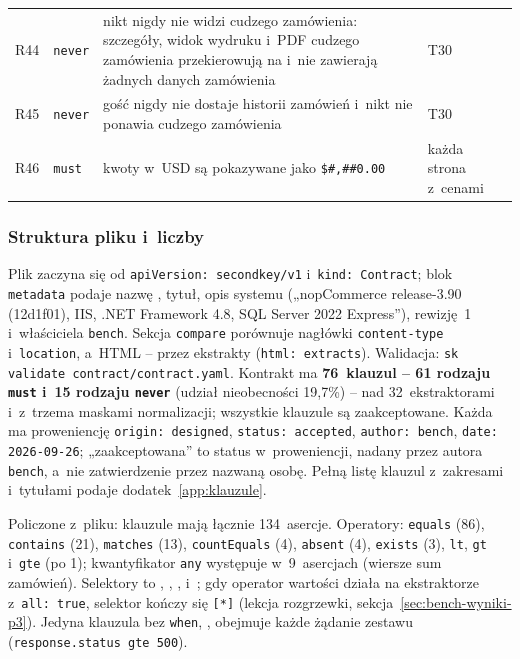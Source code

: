 {\begin{xltabular}{\linewidth}{@{}l l >{\raggedright\arraybackslash}X >{\raggedright\arraybackslash}p{2.2cm}@{}}
R44 & \texttt{never} & nikt nigdy nie widzi cudzego zamówienia: szczegóły, widok wydruku i~PDF cudzego zamówienia przekierowują na  i~nie zawierają żadnych danych zamówienia & T30 \\
R45 & \texttt{never} & gość nigdy nie dostaje historii zamówień i~nikt nie ponawia cudzego zamówienia & T30 \\
R46 & \texttt{must} & kwoty w~USD są pokazywane jako \texttt{\$\#,\#\#0.00} & każda strona z~cenami \\
\end{xltabular}
}


\subsubsection{Struktura pliku i~liczby}\label{sec:bench-kontrakt-struktura}

Plik zaczyna się od \texttt{apiVersion: secondkey/v1} i~\texttt{kind: Contract}; blok
\texttt{metadata} podaje nazwę , tytuł, opis systemu („nopCommerce
release-3.90 (12d1f01), IIS, .NET Framework 4.8, SQL Server 2022 Express”), rewizję~1
i~właściciela \texttt{bench}. Sekcja \texttt{compare} porównuje
nagłówki \texttt{content-type} i~\texttt{location}, a~HTML -- przez ekstrakty
(\texttt{html: extracts}). Walidacja: \texttt{sk validate contract/contract.yaml}.
Kontrakt ma \textbf{76~klauzul -- 61 rodzaju \texttt{must} i~15 rodzaju \texttt{never}}
(udział nieobecności 19,7\%) -- nad 32~ekstraktorami i~z~trzema maskami normalizacji;
wszystkie klauzule są zaakceptowane. Każda ma proweniencję \texttt{origin: designed},
\texttt{status: accepted}, \texttt{author: bench}, \texttt{date: 2026-09-26}; „zaakceptowana”
to status w~proweniencji, nadany przez autora \texttt{bench}, a~nie zatwierdzenie przez nazwaną
osobę. Pełną listę klauzul z~zakresami i~tytułami podaje dodatek~\ref{app:klauzule}.

Policzone z~pliku: klauzule mają łącznie 134~asercje. Operatory: \texttt{equals} (86),
\texttt{contains} (21), \texttt{matches} (13), \texttt{countEquals} (4),
\texttt{absent} (4), \texttt{exists} (3), \texttt{lt}, \texttt{gt} i~\texttt{gte} (po
1); kwantyfikator \texttt{any} występuje w~9~asercjach (wiersze sum zamówień). Selektory
to , ,
, 
i~; gdy operator wartości działa na ekstraktorze
z~\texttt{all: true}, selektor kończy się \texttt{[*]} (lekcja rozgrzewki,
sekcja~\ref{sec:bench-wyniki-p3}). Jedyna
klauzula bez \texttt{when}, , obejmuje każde żądanie zestawu
(\texttt{response.status gte 500}).

